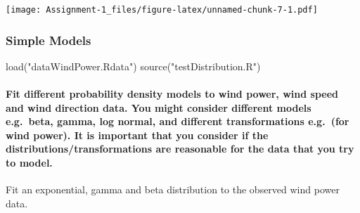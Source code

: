 \documentclass[
]{article}
\newenvironment{Shaded}{\begin{snugshade}}{\end{snugshade}}
\newcommand{\AttributeTok}[1]{\textcolor[rgb]{0.77,0.63,0.00}{#1}}
\newcommand{\FloatTok}[1]{\textcolor[rgb]{0.00,0.00,0.81}{#1}}
\newcommand{\FunctionTok}[1]{\textcolor[rgb]{0.00,0.00,0.00}{#1}}
\newcommand{\NormalTok}[1]{#1}
\newcommand{\OtherTok}[1]{\textcolor[rgb]{0.56,0.35,0.01}{#1}}
\newcommand{\SpecialCharTok}[1]{\textcolor[rgb]{0.00,0.00,0.00}{#1}}
\newcommand{\StringTok}[1]{\textcolor[rgb]{0.31,0.60,0.02}{#1}}
\begin{document}
\texttt{[image: Assignment-1\_files/figure-latex/unnamed-chunk-7-1.pdf]}

\hypertarget{simple-models}{%
\subsubsection{Simple Models}\label{simple-models}}

\begin{Shaded}
\begin{Highlighting}[]
\FunctionTok{load}\NormalTok{(}\StringTok{"dataWindPower.Rdata"}\NormalTok{)}
\FunctionTok{source}\NormalTok{(}\StringTok{"testDistribution.R"}\NormalTok{)}
\end{Highlighting}
\end{Shaded}

\hypertarget{fit-different-probability-density-models-to-wind-power-wind-speed-and-wind-direction-data.-you-might-consider-different-models-e.g.-beta-gamma-log-normal-and-different-transformations-e.g.-for-wind-power.-it-is-important-that-you-consider-if-the-distributionstransformations-are-reasonable-for-the-data-that-you-try-to-model.}{%
\paragraph{Fit different probability density models to wind power, wind
speed and wind direction data. You might consider different models
e.g.~beta, gamma, log normal, and different transformations e.g.~(for
wind power). It is important that you consider if the
distributions/transformations are reasonable for the data that you try
to
model.}\label{fit-different-probability-density-models-to-wind-power-wind-speed-and-wind-direction-data.-you-might-consider-different-models-e.g.-beta-gamma-log-normal-and-different-transformations-e.g.-for-wind-power.-it-is-important-that-you-consider-if-the-distributionstransformations-are-reasonable-for-the-data-that-you-try-to-model.}}

Fit an exponential, gamma and beta distribution to the observed wind
power data.

\begin{Shaded}
\end{Shaded}
\end{document}
